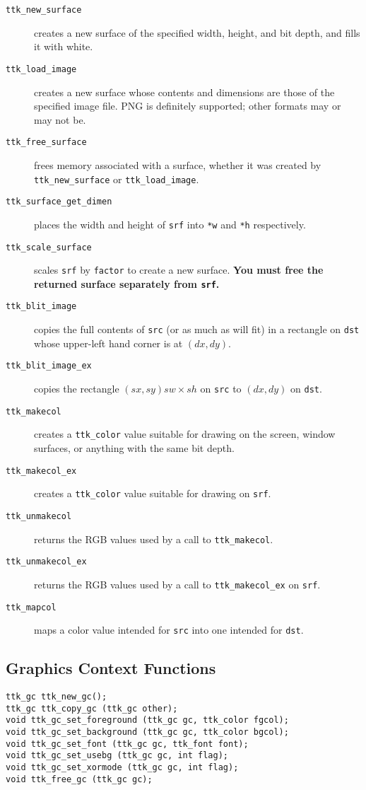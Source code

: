 \documentclass[12pt,letterpaper]{report}
\let\ttt\tt
\def\tt{\def\_{{\ttt\char`\_}}\ttt}
\begin{document}
\begin{description}
\item[{\tt ttk_new_surface}] creates a new surface of the specified width, height, and bit depth, and fills it with white.
\item[{\tt ttk_load_image}] creates a new surface whose contents and dimensions are those of the specified image file.
PNG is definitely supported; other formats may or may not be.
\item[{\tt ttk_free_surface}] frees memory associated with a surface, whether it was created by \verb|ttk_new_surface|
or \verb|ttk_load_image|.
\item[{\tt ttk_surface_get_dimen}] places the width and height of \verb|srf| into \verb|*w| and \verb|*h| respectively.
\item[{\tt ttk_scale_surface}] scales \verb|srf| by \verb|factor| to create a new surface. {\bf You must free the
returned surface separately from \verb|srf|.}
\item[{\tt ttk_blit_image}] copies the full contents of \verb|src| (or as much as will fit) in a rectangle on \verb|dst|
whose upper-left hand corner is at $(dx,dy)$.
\item[{\tt ttk_blit_image_ex}] copies the rectangle $(sx,sy) sw \times sh$ on \verb|src| to $(dx,dy)$ on \verb|dst|.
\item[{\tt ttk_makecol}] creates a \verb|ttk_color| value suitable for drawing on the screen, window surfaces, or
anything with the same bit depth.
\item[{\tt ttk_makecol_ex}] creates a \verb|ttk_color| value suitable for drawing on \verb|srf|.
\item[{\tt ttk_unmakecol}] returns the RGB values used by a call to \verb|ttk_makecol|.
\item[{\tt ttk_unmakecol_ex}] returns the RGB values used by a call to \verb|ttk_makecol_ex| on \verb|srf|.
\item[{\tt ttk_mapcol}] maps a color value intended for \verb|src| into one intended for \verb|dst|.
\end{description}

\subsection{Graphics Context Functions}
\begin{verbatim}
ttk_gc ttk_new_gc();
ttk_gc ttk_copy_gc (ttk_gc other);
void ttk_gc_set_foreground (ttk_gc gc, ttk_color fgcol);
void ttk_gc_set_background (ttk_gc gc, ttk_color bgcol);
void ttk_gc_set_font (ttk_gc gc, ttk_font font);
void ttk_gc_set_usebg (ttk_gc gc, int flag);
void ttk_gc_set_xormode (ttk_gc gc, int flag);
void ttk_free_gc (ttk_gc gc);
\end{verbatim}
\end{document}
